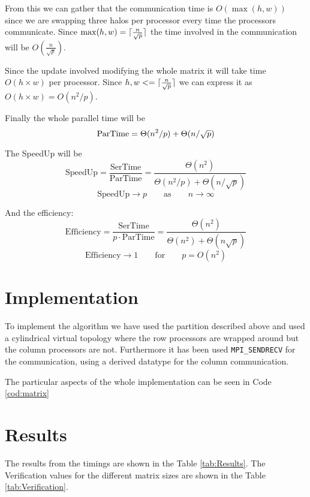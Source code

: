 \documentclass[a4paper]{article}
\begin{document}
    From this we can gather that the communication time is $O(\max(h,w))$ since we are swapping three halos per processor every time the processors communicate. Since $\max(h,w) = \lceil\frac{n}{\sqrt{p}}\rceil$ the time involved in the communication will be $O(\frac{n}{\sqrt{p}})$.

    Since the update involved modifying the whole matrix it will take time $O(h\times w)$ per processor. Since $h,w <= \lceil\frac{n}{\sqrt{p}}\rceil$ we can express it as $O(h\times w) = O(n^2/p)$.

    Finally the whole parallel time will be
    \begin{equation}
        \text{ParTime} = \Theta(n^2/p) + \Theta(n/\sqrt{p})\\
    \end{equation}

    The SpeedUp will be
    \begin{equation}
        \text{SpeedUp} = \frac{\text{SerTime}}{\text{ParTime}} = \frac{\Theta(n^2)}{\Theta(n^2/p) + \Theta(n/\sqrt{p})}
    \end{equation}
    \begin{equation}
        \text{SpeedUp} \rightarrow p \qquad\text{as}\qquad n \rightarrow \infty
    \end{equation}

    And the efficiency:
    \begin{equation}
        \text{Efficiency}  = \frac{\text{SerTime}}{p \cdot \text{ParTime}} = \frac{\Theta(n^2)}{\Theta(n^2) + \Theta(n\sqrt{p})}
    \end{equation}
    \begin{equation}
        \text{Efficiency} \rightarrow 1 \qquad\text{for}\qquad p = O(n^2)
    \end{equation}
\newpage
\section{Implementation}
    To implement the algorithm we have used the partition described above and used a cylindrical virtual topology where the row processors are wrapped around but the column processors are not. Furthermore it has been used \texttt{MPI\_SENDRECV} for the communication, using a derived datatype for the column communication.

    The particular aspects of the whole implementation can be seen in Code \ref{cod:matrix}

\section{Results}
    The results from the timings are shown in the Table \ref{tab:Results}. The Verification values for the different matrix sizes are shown in the Table \ref{tab:Verification}.
\end{document}
